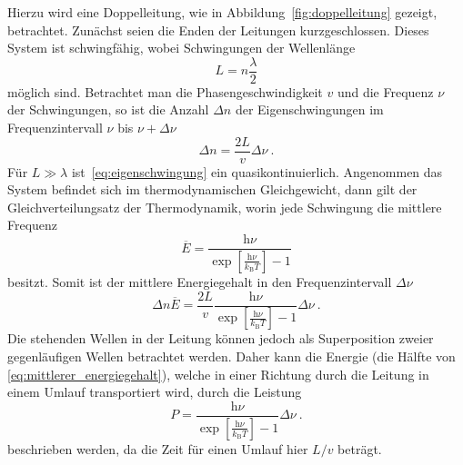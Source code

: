 Hierzu wird eine Doppelleitung, wie in Abbildung~\ref{fig:doppelleitung}
gezeigt, betrachtet. Zunächst seien die Enden der Leitungen kurzgeschlossen.
Dieses System ist schwingfähig, wobei Schwingungen der Wellenlänge
\begin{equation}
  L = n \frac{\lambda}{2}
\end{equation}
möglich sind.
Betrachtet man die Phasengeschwindigkeit $v$ und die Frequenz $\nu$ der
Schwingungen, so ist die Anzahl $\Delta n$ der Eigenschwingungen im
Frequenzintervall $\nu$ bis $\nu + \Delta \nu$
\begin{equation}
  \Delta n = \frac{2L}{v} \Delta \nu~.
  \label{eq:eigenschwingung}
\end{equation}
Für $L \gg \lambda$ ist~\eqref{eq:eigenschwingung} ein quasikontinuierlich.
Angenommen das System befindet sich im thermodynamischen Gleichgewicht, dann
gilt der Gleichverteilungsatz der Thermodynamik, worin jede Schwingung die
mittlere Frequenz
\begin{equation}
  \overline{E} = \frac{\text{h}\nu}{\exp[\frac{\text{h}\nu}{k_\text{B}T}] - 1}
\end{equation}
besitzt.
Somit ist der mittlere Energiegehalt in den Frequenzintervall $\Delta \nu$
\begin{equation}
  \Delta n \overline{E} =
  \frac{2L}{v}
  \frac{\text{h}\nu}{\exp[\frac{\text{h}\nu}{k_\text{B}T}] - 1} \Delta \nu~.
  \label{eq:mittlerer_energiegehalt}
\end{equation}
Die stehenden Wellen in der Leitung können jedoch als Superposition zweier
gegenläufigen Wellen betrachtet werden. Daher kann die Energie (die Hälfte von
\eqref{eq:mittlerer_energiegehalt}), welche in
einer Richtung durch die Leitung in einem Umlauf transportiert wird, durch
die Leistung
\begin{equation}
  P = \frac{\text{h}\nu}{\exp[\frac{\text{h}\nu}{k_\text{B}T}] - 1} \Delta \nu~.
  \label{eq:leistung}
\end{equation}
beschrieben werden, da die Zeit für einen Umlauf hier $L/v$ beträgt.

